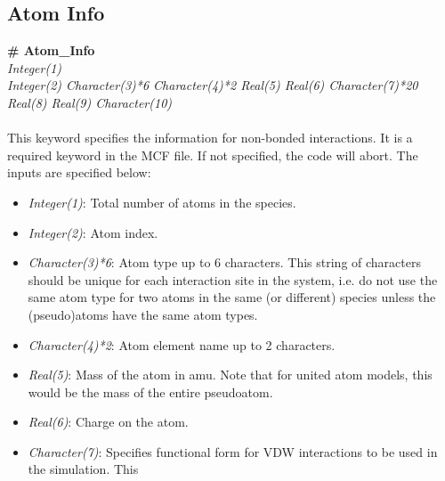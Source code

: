 {{{%
%
%
%
%
%
%
\subsection{Atom Info}\label{sec:Get_Atom_Info}
%
{\bf \# Atom\_Info} \\
{\it Integer(1)} \\
{\it Integer(2)   Character(3)*6  Character(4)*2   Real(5)   Real(6)
  Character(7)*20     Real(8)    Real(9)  Character(10)} \\ \\
%
This keyword specifies the information for non-bonded interactions. 
It is a required keyword in the MCF file. If not specified, the code will abort. The inputs are specified below: 
%
\begin{itemize} 
%
\item {\it Integer(1)}: Total number of atoms in the species. 
%
\item {\it Integer(2)}: Atom index. 
%
\item {\it Character(3)*6}: Atom type up to 6 characters. This string of characters should be
unique for each interaction site in the system, i.e. do not use the same atom type
for two atoms in the same (or different) species unless the (pseudo)atoms have the same atom types. 
%
\item {\it Character(4)*2}: Atom element name up to 2 characters. 
%
\item {\it Real(5)}: Mass of the atom in amu. Note that for united atom models, this would be the
mass of the entire pseudoatom. 
%
\item {\it Real(6)}: Charge on the atom.
%
\item {\it Character(7)}: Specifies functional form for VDW interactions to be used in the simulation. This

\end{itemize}}}}
